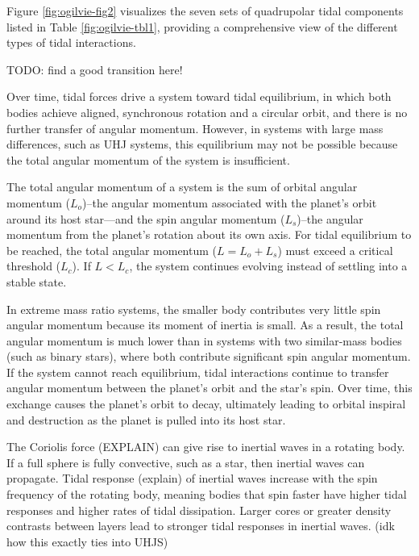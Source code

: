 \documentclass[oneside,12pt]{amsart}
\numberwithin{page}{section}
\begin{document}
Figure \ref{fig:ogilvie-fig2} visualizes the seven sets of quadrupolar tidal components listed in Table \ref{fig:ogilvie-tbl1}, providing a comprehensive view of the different types of tidal interactions.

TODO: find a good transition here!

Over time, tidal forces drive a system toward tidal equilibrium, in which both bodies achieve aligned, synchronous rotation and a circular orbit, and there is no further transfer of angular momentum. However, in systems with large mass differences, such as UHJ systems, this equilibrium may not be possible because the total angular momentum of the system is insufficient.

The total angular momentum of a system is the sum of orbital angular momentum ($L_o$)–the angular momentum associated with the planet's orbit around its host star—and the spin angular momentum ($L_s$)–the angular momentum from the planet’s rotation about its own axis.
For tidal equilibrium to be reached, the total angular momentum ($L = L_o + L_s$) must exceed a critical threshold ($L_c$). If $L < L_c$, the system continues evolving instead of settling into a stable state.

In extreme mass ratio systems, the smaller body contributes very little spin angular momentum because its moment of inertia is small. As a result, the total angular momentum is much lower than in systems with two similar-mass bodies (such as binary stars), where both contribute significant spin angular momentum. If the system cannot reach equilibrium, tidal interactions continue to transfer angular momentum between the planet’s orbit and the star’s spin. Over time, this exchange causes the planet’s orbit to decay, ultimately leading to orbital inspiral and destruction as the planet is pulled into its host star.



The Coriolis force (EXPLAIN) can give rise to inertial waves in a rotating body. If a full sphere is fully convective, such as a star, then inertial waves can propagate. Tidal response (explain) of inertial waves increase with the spin frequency of the rotating body, meaning bodies that spin faster have higher tidal responses and higher rates of tidal dissipation. Larger cores or greater density contrasts between layers lead to stronger tidal responses in inertial waves. (idk how this exactly ties into UHJS)
\end{document}
